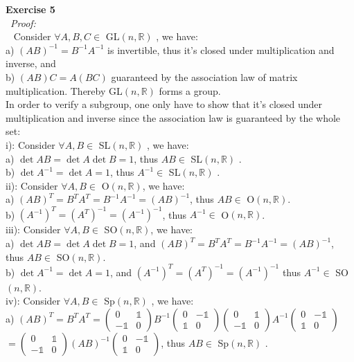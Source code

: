 \documentclass[12pt]{article}
\def\ep#1#2{{\bf Exercise #1}\\~{\it Proof:}\\~#2\\[1em]}
\begin{document}
\ep{5}{
\def\mat{Mat$(n\times n,\mathbb{R})$}
\def\GL{GL$(n,\mathbb{R})$ }
\def\SL{SL$(n,\mathbb{R})$ }
\def\O{O$(n,\mathbb{R})$}
\def\SO{SO$(n,\mathbb{R})$}
\def\Sp{Sp$(n,\mathbb{R})$ }
\def\1{\mathbb{1}}
Consider $\forall A,B,C\in$ \GL, we have:\\
a) ${\left(AB\right)}^{-1}=B^{-1}A^{-1}$ is invertible, thus it's closed under multiplication and inverse, and\\
b) $(AB)C=A(BC)$ guaranteed by the association law of matrix multiplication.
Thereby \GL forms a group.\\
In order to verify a subgroup, one only have to show that it's closed under multiplication and inverse since the association law is guaranteed by the whole set:\\
i): Consider $\forall A,B\in$ \SL, we have:\\
 a) $\det{AB}=\det{A}\det{B}=1$, thus $AB\in$ \SL.\\
 b) $\det{A^{-1}}=\det{A}=1$, thus $A^{-1}\in$ \SL.\\
ii): Consider $\forall A,B\in$ \O, we have:\\
 a) ${(AB)}^{T}=B^TA^T=B^{-1}A^{-1}={(AB)}^{-1}$, thus $AB\in$ \O.\\
 b) ${(A^{-1})}^{T}={(A^{T})}^{-1}={(A^{-1})}^{-1}$, thus $A^{-1}\in$ \O.\\
 iii): Consider $\forall A,B\in$ \SO, we have:\\
 a) $\det{AB}=\det{A}\det{B}=1$, and ${(AB)}^{T}=B^TA^T=B^{-1}A^{-1}={(AB)}^{-1}$, thus $AB\in$ \SO.\\
 b) $\det{A^{-1}}=\det{A}=1$, and ${(A^{-1})}^{T}={(A^{T})}^{-1}={(A^{-1})}^{-1}$ thus $A^{-1}\in$ \SO.\\
 iv): Consider $\forall A,B\in$ \Sp, we have:\\
 a) ${(AB)}^T=B^{T}A^{T}=\begin{pmatrix}0&\1\\ -\1&0\end{pmatrix}B^{-1}\begin{pmatrix}0&-\1\\ \1&0\end{pmatrix}\begin{pmatrix}0&\1\\ -\1&0\end{pmatrix}A^{-1}\begin{pmatrix}0&-\1\\ \1&0\end{pmatrix}$\\
 $=\begin{pmatrix}0&\1\\ -\1&0\end{pmatrix}{(AB)}^{-1}\begin{pmatrix}0&-\1\\\1&0\end{pmatrix}$, thus $AB\in$ \Sp.\\ 
}
\end{document}
